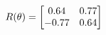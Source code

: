 \documentclass[preview]{standalone}
\begin{document}
\begin{align*}
\special{dvisvgm:raw <g id='unique000'>}R(\theta) = \begin{bmatrix}0.64 & 0.77\\-0.77 & 0.64\end{bmatrix}\special{dvisvgm:raw </g>}
\end{align*}
\end{document}
